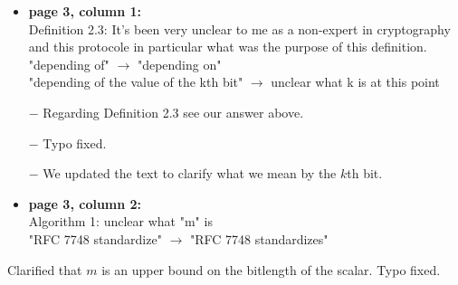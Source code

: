 \begin{itemize}

  \item \textbf{page 3, column 1:}\\
        Definition 2.3: It's been very unclear to me as a non-expert in cryptography and this protocole in particular what was the purpose of this definition.\\
        {\color{gray}"depending of" $\rightarrow$ "depending on"}\\
        "depending of the value of the kth bit" $\rightarrow$ unclear what k is at this point
\end{itemize}
\begin{answer}
  \begin{itemize}
    \item[$-$] Regarding Definition 2.3 see our answer above.
    \item[$-$] Typo fixed.
    \item[$-$] We updated the text to clarify what we mean by the $k$th bit.
  \end{itemize}
\end{answer}

\begin{itemize}
  \item \textbf{page 3, column 2:}\\
        Algorithm 1: unclear what "m" is\\
        "RFC 7748 standardize" $\rightarrow$   "RFC 7748 standardizes"
\end{itemize}
\begin{answer}
  Clarified that $m$ is an upper bound on the bitlength of the scalar. Typo fixed.
\end{answer}

